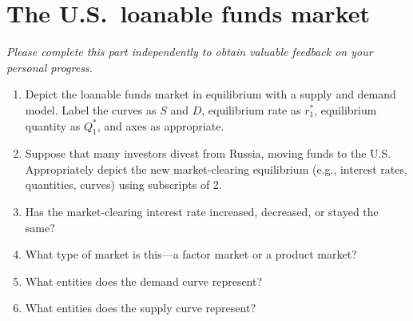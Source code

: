 \documentclass[
    letterpaper,paper=portrait,fleqn,
    DIV=16,fontsize=12pt,twoside=semi,
    parskip=full-,
    headings=standardclasses]
{scrartcl}
\begin{document}
\vspace{-1\baselineskip}
\clearpage

\section{The U.S.~loanable funds market}

\emph{Please complete this part independently to obtain valuable feedback on your personal progress.}

\begin{center}
\vspace{18pt}
\end{center}

\begin{enumerate}

\item Depict the loanable funds market in equilibrium with a supply and demand model. Label the curves as $S$ and $D$, equilibrium rate as $r^*_1$, equilibrium quantity as $Q^*_1$, and axes as appropriate.

\item Suppose that many investors divest from Russia, moving funds to the U.S. Appropriately depict the new market-clearing equilibrium (e.g., interest rates, quantities, curves) using subscripts of 2.

\item Has the market-clearing interest rate increased, decreased, or stayed the same?

\vfill

\item What type of market is this---a factor market or a product market?

\vfill

\item What entities does the demand curve represent?

\vfill

\item What entities does the supply curve represent?

\vfill

\vspace{-1\baselineskip}

\end{enumerate}
\end{document}
